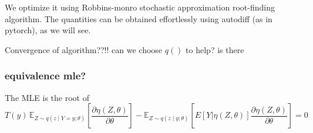 \documentclass[twoside,11pt]{article}
\begin{document}
We optimize it using Robbins-monro stochastic approximation root-finding algorithm. The quantities can be obtained effortlessly using autodiff (as in pytorch), as we will see.

Convergence of algorithm??!! can we choose $q()$ to help? is there 

\subsubsection{equivalence mle?}
The MLE is the root of
%
\[
T(y) \, \mathbb{E}_{Z \sim q(z \mid Y = y; \theta)} \left[ \frac{\partial \eta(Z, \theta)}{\partial \theta} \right] - \mathbb{E}_{Z \sim q(z \mid y; \theta)} \left[ E[Y|\eta(Z, \theta)] \frac{\partial \eta(Z, \theta)}{\partial \theta} \right] = 0
\]
%
\end{document}
